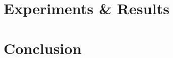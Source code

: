\documentclass[twoside]{ctuthesis}
\theoremstyle{plain}
\theoremstyle{definition}
\theoremstyle{note}
\begin{document}
\chapter{Experiments \& Results} 
\label{results}

\chapter{Conclusion}
\label{conclusions}


\printbibliography


% 
\end{document}
